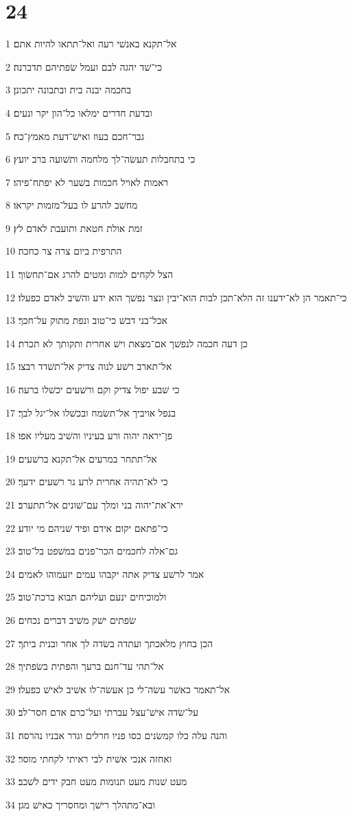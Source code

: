 \chapter{24}

\par 1 אל־תקנא באנשׁי רעה ואל־תתאו להיות אתם׃
\par 2 כי־שׁד יהגה לבם ועמל שׂפתיהם תדברנה׃
\par 3 בחכמה יבנה בית ובתבונה יתכונן׃
\par 4 ובדעת חדרים ימלאו כל־הון יקר ונעים׃
\par 5 גבר־חכם בעוז ואישׁ־דעת מאמץ־כח׃
\par 6 כי בתחבלות תעשׂה־לך מלחמה ותשׁועה ברב יועץ׃
\par 7 ראמות לאויל חכמות בשׁער לא יפתח־פיהו׃
\par 8 מחשׁב להרע לו בעל־מזמות יקראו׃
\par 9 זמת אולת חטאת ותועבת לאדם לץ׃
\par 10 התרפית ביום צרה צר כחכה׃
\par 11 הצל לקחים למות ומטים להרג אם־תחשׂוך׃
\par 12 כי־תאמר הן לא־ידענו זה הלא־תכן לבות הוא־יבין ונצר נפשׁך הוא ידע והשׁיב לאדם כפעלו׃
\par 13 אכל־בני דבשׁ כי־טוב ונפת מתוק על־חכך׃
\par 14 כן דעה חכמה לנפשׁך אם־מצאת וישׁ אחרית ותקותך לא תכרת׃
\par 15 אל־תארב רשׁע לנוה צדיק אל־תשׁדד רבצו׃
\par 16 כי שׁבע יפול צדיק וקם ורשׁעים יכשׁלו ברעה׃
\par 17 בנפל אויביך אל־תשׂמח ובכשׁלו אל־יגל לבך׃
\par 18 פן־יראה יהוה ורע בעיניו והשׁיב מעליו אפו׃
\par 19 אל־תתחר במרעים אל־תקנא ברשׁעים׃
\par 20 כי לא־תהיה אחרית לרע נר רשׁעים ידעך׃
\par 21 ירא־את־יהוה בני ומלך עם־שׁונים אל־תתערב׃
\par 22 כי־פתאם יקום אידם ופיד שׁניהם מי יודע׃
\par 23 גם־אלה לחכמים הכר־פנים במשׁפט בל־טוב׃
\par 24 אמר לרשׁע צדיק אתה יקבהו עמים יזעמוהו לאמים׃
\par 25 ולמוכיחים ינעם ועליהם תבוא ברכת־טוב׃
\par 26 שׂפתים ישׁק משׁיב דברים נכחים׃
\par 27 הכן בחוץ מלאכתך ועתדה בשׂדה לך אחר ובנית ביתך׃
\par 28 אל־תהי עד־חנם ברעך והפתית בשׂפתיך׃
\par 29 אל־תאמר כאשׁר עשׂה־לי כן אעשׂה־לו אשׁיב לאישׁ כפעלו׃
\par 30 על־שׂדה אישׁ־עצל עברתי ועל־כרם אדם חסר־לב׃
\par 31 והנה עלה כלו קמשׂנים כסו פניו חרלים וגדר אבניו נהרסה׃
\par 32 ואחזה אנכי אשׁית לבי ראיתי לקחתי מוסר׃
\par 33 מעט שׁנות מעט תנומות מעט חבק ידים לשׁכב׃
\par 34 ובא־מתהלך רישׁך ומחסריך כאישׁ מגן׃

